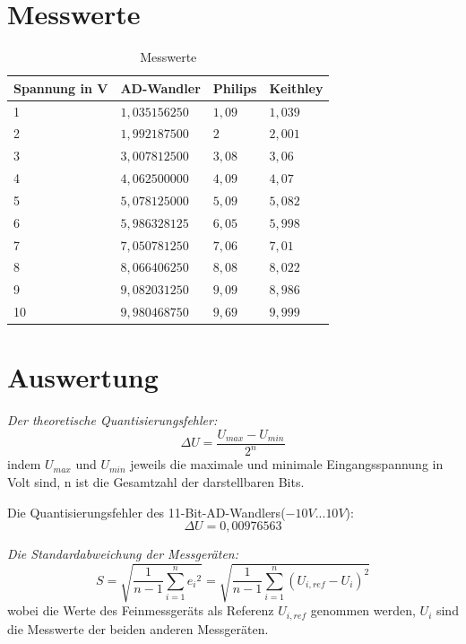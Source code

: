 \documentclass[12pt, oneside, a4paper, \docLanguage]{report}
\begin{document}
\section{Messwerte}
\label{chap:VERSUCH_2_MESSWERTE}


\begin{table}[H]
\centering
\begin{tabular}{|l|l|l|l|}
\hline
\multicolumn{1}{|c|}{Spannung in V} & \multicolumn{1}{c|}{AD-Wandler}	& \multicolumn{1}{c|}{Philips}	& \multicolumn{1}{c|}{Keithley}								\\ \hline
1						&$1,035156250$		&$1,09$			&$1,039$ 		\\ \hline
2						&$1,992187500$		&$2$			&$2,001$		\\ \hline
3						&$3,007812500$		&$3,08$			&$3,06$			\\ \hline
4						&$4,062500000$		&$4,09$			&$4,07$			\\ \hline
5						&$5,078125000$		&$5,09$			&$5,082$		\\ \hline
6						&$5,986328125$		&$6,05$			&$5,998$		\\ \hline
7						&$7,050781250$		&$7,06$			&$7,01$			\\ \hline
8						&$8,066406250$		&$8,08$			&$8,022$		\\ \hline
9						&$9,082031250$		&$9,09$			&$8,986$		\\ \hline
10						&$9,980468750$		&$9,69$			&$9,999$		\\ \hline
\end{tabular}
\caption{Messwerte}
\end{table}
\section{Auswertung}

\label{chap:VERSUCH_2_AUSWERTUNG}

\qquad\textit{Der theoretische Quantisierungsfehler:} $$\Delta{U}=\frac{U_{max}-U_{min}}{2^n}$$ indem $U_{max}$ und $U_{min}$ jeweils die maximale und minimale Eingangsspannung in Volt sind, n ist die Gesamtzahl der darstellbaren Bits.

\qquad Die Quantisierungsfehler des 11-Bit-AD-Wandlers($-10V ... 10V$): $$\Delta{U}=0,00976563$$

\qquad\textit{Die Standardabweichung der Messgeräten:} $$S=\sqrt{\frac{1}{n-1}\sum_{i=1}^n{e_i}^2}=\sqrt{\frac{1}{n-1}\sum_{i=1}^n{(U_{i,ref}-U_i)}^2}$$ wobei die Werte des Feinmessgeräts als Referenz $U_{i,ref}$ genommen werden, $U_i$ sind die Messwerte der beiden anderen Messgeräten.
\end{document}
